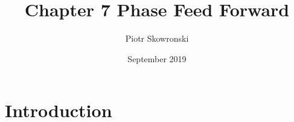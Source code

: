 \documentclass{article}
\title{Chapter 7 Phase Feed Forward}
\author{Piotr Skowronski}
\date{September 2019}
\begin{document}
\maketitle

\section{Introduction}
\end{document}
